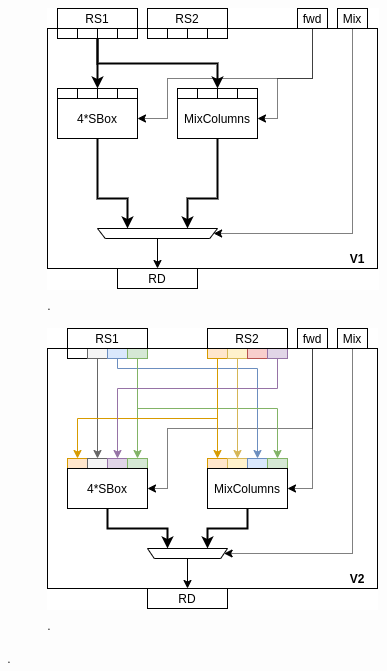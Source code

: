 
\begin{figure}[t]
\centering
\begin{subfigure}[t]{0.40\textwidth}
    \centering
    \includegraphics[width=\textwidth]{diagrams/ise-datapath-v1.png}
    \caption{.}
    \label{fig:ise:design:v1}
\end{subfigure}
\begin{subfigure}[t]{0.40\textwidth}
    \centering
    \includegraphics[width=\textwidth]{diagrams/ise-datapath-v2.png}
    \caption{.}
    \label{fig:ise:design:v2}
\end{subfigure}


\end{figure}
